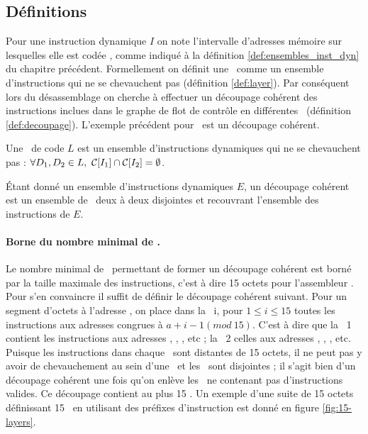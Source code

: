 \subsection{Définitions\label{sec:chevauchement_analyse_definitions}}

Pour une instruction dynamique $I$ on note l'intervalle d'adresses mémoire sur lesquelles elle est codée , comme indiqué à la définition \ref{def:ensembles_inst_dyn} du chapitre précédent.
Formellement on définit une \layer\ comme un ensemble d'instructions qui ne se chevauchent pas (définition \ref{def:layer}).
Par conséquent lors du désassemblage on cherche à effectuer un découpage cohérent des instructions inclues dans le graphe de flot de contrôle en différentes \layers\ (définition \ref{def:decoupage}).
L'exemple précédent pour \telock\ est un découpage cohérent.

\begin{defi}
 Une \layer\ de code $L$ est un ensemble d'instructions dynamiques qui ne se chevauchent pas : $\forall D_1, D_2\in L,\ \mdc{I_1}\cap\mdc{I_2}=\emptyset$.
\label{def:layer}
\end{defi}

\begin{defi}
 Étant donné un ensemble d'instructions dynamiques $E$, un découpage cohérent est un ensemble de \layers\ deux à deux disjointes et recouvrant l'ensemble des instructions de $E$.
\label{def:decoupage}
\end{defi}

\paragraph{Borne du nombre minimal de \layers.}
Le nombre minimal de \layers\ permettant de former un découpage cohérent est borné par la taille maximale des instructions, c'est à dire 15 octets pour l'assembleur \xq.
Pour s'en convaincre il suffit de définir le découpage cohérent suivant. Pour un segment d'octets à l'adresse , on place dans la \layer\ i, pour $1\leq i\leq 15$ toutes les instructions aux adresses congrues à $a+i-1 (mod\ 15)$. C'est à dire que la \layer\ 1 contient les instructions aux adresses , , , etc ; la \layer\ 2 celles aux adresses , , , etc. Puisque les instructions dans chaque \layer\ sont distantes de 15 octets, il ne peut pas y avoir de chevauchement au sein d'une \layer\ et les \layers\ sont disjointes ; il s'agit bien d'un découpage cohérent une fois qu'on enlève les \layers\ ne contenant pas d'instructions valides. Ce découpage contient au plus 15 \layers.
Un exemple d'une suite de 15 octets définissant 15 \layer\ en utilisant des préfixes d'instruction est donné en figure \ref{fig:15-layers}.

